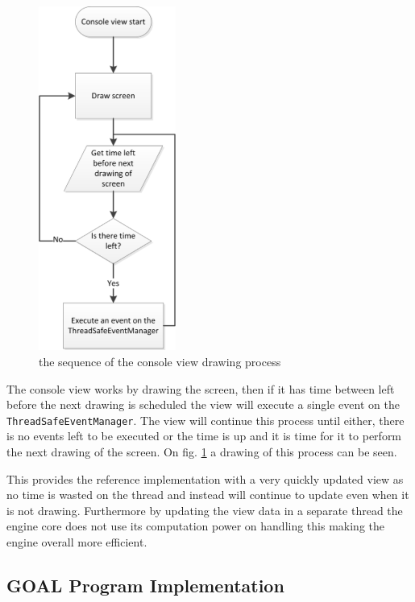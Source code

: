 \begin{figure}
\includegraphics[width=0.4\textwidth]{ConsoleViewDrawingFlowChart}

\caption{the sequence of the console view drawing process\label{fig:FlowOfConsole}}


\end{figure}


The console view works by drawing the screen, then if it has time
between left before the next drawing is scheduled the view will execute
a single event on the \texttt{ThreadSafeEventManager}. The view will
continue this process until either, there is no events left to be
executed or the time is up and it is time for it to perform the next
drawing of the screen. On fig. \ref{fig:FlowOfConsole} a drawing
of this process can be seen.

This provides the reference implementation with a very quickly updated
view as no time is wasted on the thread and instead will continue
to update even when it is not drawing. Furthermore by updating the
view data in a separate thread the engine core does not use its computation
power on handling this making the engine overall more efficient.


\subsection{GOAL Program Implementation}

